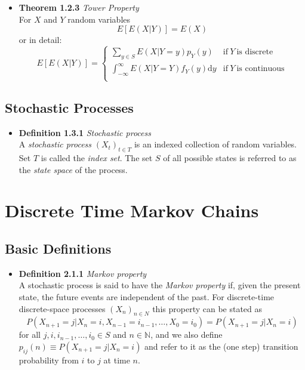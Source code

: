 \documentclass[11pt,a4paper]{article}
\begin{document}
\begin{itemize}

    \item \textbf{Theorem 1.2.3} \emph{Tower Property}\\
        For $X$ and $Y$ random variables
        \[
            E[E(X|Y)] = E(X)
        \]
        or in detail:
        \[
            E[E(X|Y)] =
            \begin{cases}{}
                \sum_{y \in S} E(X|Y = y) p_Y(y) & \text{if} \ Y \ \text{is discrete} \\
                \int_{-\infty}^\infty E(X|Y = Y)f_Y(y) \mathrm{d}y & \text{if} \ Y \
                \text{is continuous} \\
            \end{cases}
        \]

\end{itemize}

\subsection{Stochastic Processes}

\begin{itemize}

    \item \textbf{Definition 1.3.1} \emph{Stochastic process} \\
        A \emph{stochastic process} ${(X_t)}_{t \in T}$
        is an indexed collection of random variables.
        Set $T$ is called the \emph{index set}.
        The set $S$ of all possible states is referred to as the \emph{state space}
        of the process.

\end{itemize}

\section{Discrete Time Markov Chains}

\subsection{Basic Definitions}

\begin{itemize}

    \item \textbf{Definition 2.1.1} \emph{Markov property}\\
        A stochastic process is said to have the \emph{Markov property} if,
        given the present state, the future events are independent of the past.
        For discrete-time discrete-space processes ${(X_n)}_{n \in N}$ this
        property can be stated as
        \[
            P(X_{n+1} = j | X_n = i, X_{n-1} = i_{n-1},
            \ldots, X_0 = i_0) = P(X_{n+1} = j | X_n = i)
        \]
        for all $j, i, i_{n-1}, \ldots, i_0 \in S$ and $n \in \mathbb{N}$,
        and we also define
        $p_{ij}(n) \equiv P(X_{n+1} = j | X_n = i)$
        and refer to it as the (one step) transition probability from $i$ to $j$ at time $n$.

\end{itemize}
\end{document}
